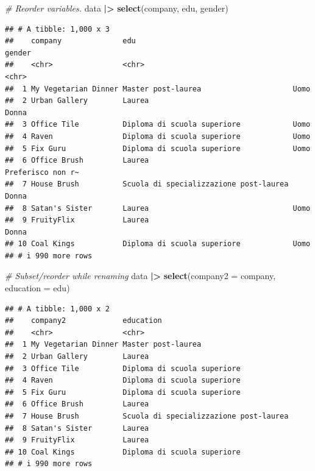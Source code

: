 \documentclass[
]{book}
\newenvironment{Shaded}{\begin{snugshade}}{\end{snugshade}}
\newcommand{\AttributeTok}[1]{\textcolor[rgb]{0.13,0.29,0.53}{#1}}
\newcommand{\CommentTok}[1]{\textcolor[rgb]{0.56,0.35,0.01}{\textit{#1}}}
\newcommand{\FunctionTok}[1]{\textcolor[rgb]{0.13,0.29,0.53}{\textbf{#1}}}
\newcommand{\NormalTok}[1]{#1}
\newcommand{\SpecialCharTok}[1]{\textcolor[rgb]{0.81,0.36,0.00}{\textbf{#1}}}
\begin{document}
\begin{Shaded}
\begin{Highlighting}[]
\CommentTok{\# Reorder variables.}
\NormalTok{data }\SpecialCharTok{|\textgreater{}} 
  \FunctionTok{select}\NormalTok{(company, edu, gender)}
\end{Highlighting}
\end{Shaded}

\begin{verbatim}
## # A tibble: 1,000 x 3
##    company              edu                                    gender           
##    <chr>                <chr>                                  <chr>            
##  1 My Vegetarian Dinner Master post-laurea                     Uomo             
##  2 Urban Gallery        Laurea                                 Donna            
##  3 Office Tile          Diploma di scuola superiore            Uomo             
##  4 Raven                Diploma di scuola superiore            Uomo             
##  5 Fix Guru             Diploma di scuola superiore            Uomo             
##  6 Office Brush         Laurea                                 Preferisco non r~
##  7 House Brush          Scuola di specializzazione post-laurea Donna            
##  8 Satan's Sister       Laurea                                 Uomo             
##  9 FruityFlix           Laurea                                 Donna            
## 10 Coal Kings           Diploma di scuola superiore            Uomo             
## # i 990 more rows
\end{verbatim}

\begin{Shaded}
\begin{Highlighting}[]
\CommentTok{\# Subset/reorder while renaming}
\NormalTok{data }\SpecialCharTok{|\textgreater{}} 
  \FunctionTok{select}\NormalTok{(}\AttributeTok{company2 =}\NormalTok{ company, }\AttributeTok{education =}\NormalTok{ edu)}
\end{Highlighting}
\end{Shaded}

\begin{verbatim}
## # A tibble: 1,000 x 2
##    company2             education                             
##    <chr>                <chr>                                 
##  1 My Vegetarian Dinner Master post-laurea                    
##  2 Urban Gallery        Laurea                                
##  3 Office Tile          Diploma di scuola superiore           
##  4 Raven                Diploma di scuola superiore           
##  5 Fix Guru             Diploma di scuola superiore           
##  6 Office Brush         Laurea                                
##  7 House Brush          Scuola di specializzazione post-laurea
##  8 Satan's Sister       Laurea                                
##  9 FruityFlix           Laurea                                
## 10 Coal Kings           Diploma di scuola superiore           
## # i 990 more rows
\end{verbatim}
\end{document}
